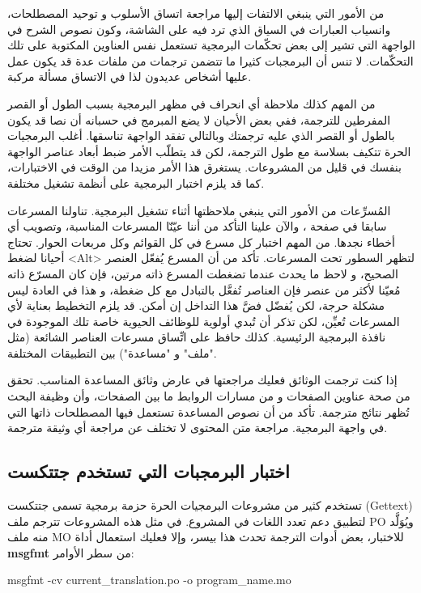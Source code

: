 من الأمور التي ينبغي الالتفات إليها مراجعة اتساق الأسلوب و توحيد
المصطلحات، وانسياب العبارات في السياق الذي ترد فيه على الشاشة، وكون
نصوص الشرح في الواجهة التي تشير إلى بعض تحكّمات البرمجية تستعمل نفس
العناوين المكتوبة على تلك التحكّمات. لا تنس أن البرمجبات كثيرا ما تتضمن
ترجمات من ملفات عدة قد يكون عمل عليها أشخاص عديدون لذا في الاتساق مسألة
مركبة.

من المهم كذلك ملاحظة أي انحراف في مظهر البرمجية بسبب الطول أو القصر
المفرطين للترجمة، ففي بعض الأحيان لا يضع المبرمج في حسبانه أن نصا قد
يكون بالطول أو القصر الذي عليه ترجمتك وبالتالي تفقد الواجهة تناسقها.
أغلب البرمجيات الحرة تتكيف بسلاسة مع طول الترجمة، لكن قد يتطلّب الأمر
ضبط أبعاد عناصر الواجهة بنفسك في قليل من المشروعات. يستغرق هذا الأمر
مزيدا من الوقت في الاختبارات، كما قد يلزم اختبار البرمجية على أنظمة
تشغيل مختلفة.

المُسرِّعات من الأمور التي ينبغي ملاحظتها أثناء تشغيل البرمجية. تناولنا
المسرعات سابقا في صفحة ، والآن علينا التأكد
من أننا عيّنّا المسرعات المناسبة، وتصويب أي أخطاء نجدها. من المهم
اختبار كل مسرع في كل القوائم وكل مربعات الحوار. تحتاج أحيانا لضغط <Alt>
لتظهر السطور تحت المسرعات. تأكد من أن المسرع يُفعّل العنصر الصحيح، و
لاحظ ما يحدث عندما تضغطت المسرع ذاته مرتين، فإن كان المسرّع ذاته
مُعيّنا لأكثر من عنصر فإن العناصر تُفعَّل بالتبادل مع كل ضغطة، و هذا في
العادة ليس مشكلة حرجة، لكن يُفضّل فضَّ هذا التداخل إن أمكن. قد يلزم
التخطيط بعناية لأي المسرعات تُعيِّن، لكن تذكر أن تُبدي أولوية للوظائف
الحيوية خاصة تلك الموجودة في نافذة البرمجية الرئيسية. كذلك حافظ على
اتِّساق مسرعات العناصر الشائعة (مثل "ملف" و "مساعدة") بين التطبيقات
المختلفة.

إذا كنت ترجمت الوثائق فعليك مراجعتها في عارض وثائق المساعدة المناسب.
تحقق من صحة عناوين الصفحات و من مسارات الروابط ما بين الصفحات، وأن
وظيفة البحث تُظهر نتائج مترجمة. تأكد من أن نصوص المساعدة تستعمل فيها
المصطلحات ذاتها التي في واجهة البرمجية. مراجعة متن المحتوى لا تختلف عن
مراجعة أي وثيقة مترجمة.

\subsection{اختبار البرمجبات التي تستخدم جتتكست}
تستخدم كثير من مشروعات البرمجيات الحرة حزمة برمجية تسمى جتتكست (Gettext)
لتطبيق دعم تعدد اللغات في المشروع. في مثل هذه المشروعات تترجم ملف PO
ويُوَلَّد منه ملف MO للاختبار، بعض أدوات الترجمة تحدث هذا بيسر، وإلا
فعليك استعمال أداة {\bf msgfmt} من سطر الأوامر:

msgfmt  -cv  current\_translation.po  -o program\_name.mo

